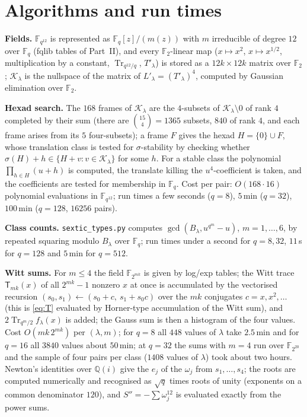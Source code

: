 ﻿\documentclass[12pt,a4paper]{amsart}
\theoremstyle{definition}
\newcommand{\F}{\mathbb{F}}
\newcommand{\Q}{\mathbb{Q}}
\newcommand{\Tr}{\operatorname{Tr}}
\newcommand{\Kk}{\mathcal{K}}
\newcommand{\Spp}{S''}
\begin{document}
\section{Algorithms and run times}\label{app:algo}
\textbf{Fields.} $\F_{q^{12}}$ is represented as $\F_q[z]/(m(z))$ with $m$ irreducible of degree $12$ over $\F_q$ (fqlib tables of Part~II), and every $\F_2$-linear map ($x\mapsto x^2$, $x\mapsto x^{1/2}$, multiplication by a constant, $\Tr_{q^{12}/q}$, $T'_\lambda$) is stored as a $12k\times12k$ matrix over $\F_2$; $\Kk_\lambda$ is the nullspace of the matrix of $L'_\lambda=(T'_\lambda)^4$, computed by Gaussian elimination over $\F_2$.

\textbf{Hexad search.} The $168$ frames of $\Kk_\lambda$ are the $4$-subsets of $\Kk_\lambda\setminus0$ of rank $4$ completed by their sum (there are $\binom{15}4=1365$ subsets, $840$ of rank $4$, and each frame arises from its $5$ four-subsets); a frame $F$ gives the hexad $H=\{0\}\cup F$, whose translation class is tested for $\sigma$-stability by checking whether $\sigma(H)+h\in\{H+v:v\in\Kk_\lambda\}$ for some $h$. For a stable class the polynomial $\prod_{h\in H}(u+h)$ is computed, the translate killing the $u^4$-coefficient is taken, and the coefficients are tested for membership in $\F_q$. Cost per pair: $O(168\cdot16)$ polynomial evaluations in $\F_{q^{12}}$; run times a few seconds ($q=8$), $5$\,min ($q=32$), $100$\,min ($q=128$, $16256$ pairs).

\textbf{Class counts.} \texttt{sextic\_types.py} computes $\gcd(B_\lambda,u^{q^m}-u)$, $m=1,\dots,6$, by repeated squaring modulo $B_\lambda$ over $\F_q$; run times under a second for $q=8,32$, $11$\,s for $q=128$ and $5$\,min for $q=512$.

\textbf{Witt sums.} For $m\le4$ the field $\F_{2^{mk}}$ is given by log/exp tables; the Witt trace $\mathsf T_{mk}(x)$ of all $2^{mk}-1$ nonzero $x$ at once is accumulated by the vectorised recursion $(s_0,s_1)\leftarrow(s_0+c,\ s_1+s_0c)$ over the $mk$ conjugates $c=x,x^2,\dots$ (this is \eqref{eq:T} evaluated by Horner-type accumulation of the Witt sum), and $2\Tr_{q^m/2}f_\lambda(x)$ is added; the Gauss sum is then a histogram of the four values. Cost $O(mk\,2^{mk})$ per $(\lambda,m)$; for $q=8$ all $448$ values of $\lambda$ take $2.5$\,min and for $q=16$ all $3840$ values about $50$\,min; at $q=32$ the sums with $m=4$ run over $\F_{2^{20}}$ and the sample of four pairs per class ($1408$ values of $\lambda$) took about two hours. Newton's identities over $\Q(i)$ give the $e_j$ of the $\omega_j$ from $s_1,\dots,s_4$; the roots are computed numerically and recognised as $\sqrt q$ times roots of unity (exponents on a common denominator $120$), and $\Spp=-\sum\omega_j^{12}$ is evaluated exactly from the power sums.
\end{document}
